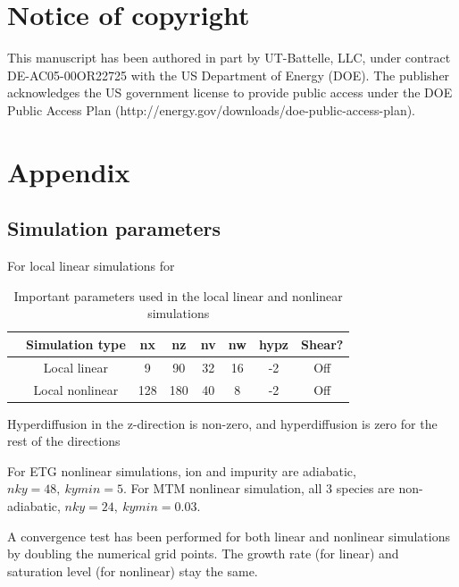 \documentclass[
 aip,
 amsmath,amssymb,
 reprint
]{revtex4-1}
\begin{document}
\section{Notice of copyright}

This manuscript has been authored in part by UT-Battelle, LLC, under contract DE-AC05-00OR22725 with the US Department of Energy (DOE). The publisher acknowledges the US government license to provide public access under the DOE Public Access Plan (http://energy.gov/downloads/doe-public-access-plan).


\section{Appendix}

\subsection{Simulation parameters}

For local linear simulations for 
\begin{table}[H]
    \centering
    \begin{tabular}{|c|c|c|c|c|c|c|c|}
         \hline
         & Simulation type & nx & nz & nv & nw & hypz &Shear? \\
         \hline
         & Local linear & 9 & 90 & 32 & 16 & -2 & Off \\
         \hline
         & Local nonlinear & 128 & 180 & 40 & 8 & -2 & Off \\
         \hline
\end{tabular}
\caption[font=5]{Important parameters used in the local linear and nonlinear simulations}
\label{ch:sim_para}
\end{table}

Hyperdiffusion in the z-direction is non-zero, and hyperdiffusion is zero for the rest of the directions

For ETG nonlinear simulations, ion and impurity are adiabatic, $nky=48,\ kymin=5 $. For MTM nonlinear simulation, all 3 species are non-adiabatic, $nky=24,\ kymin=0.03 $. 

A convergence test has been performed for both linear and nonlinear simulations by doubling the numerical grid points. The growth rate (for linear) and saturation level (for nonlinear) stay the same. 

\end{document}

